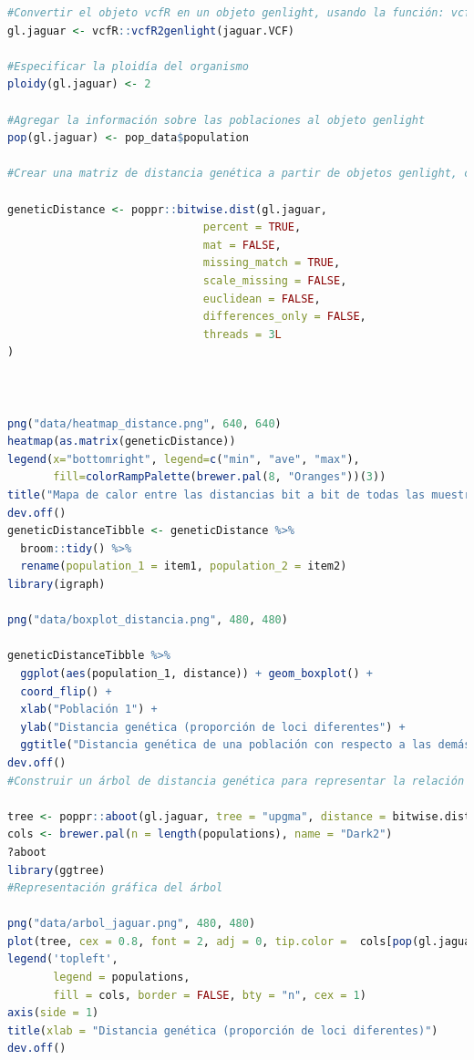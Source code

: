 \documentclass{article}
\begin{document}
\begin{lstlisting}[language=R]
#Convertir el objeto vcfR en un objeto genlight, usando la función: vcfR2genlight:
gl.jaguar <- vcfR::vcfR2genlight(jaguar.VCF)

#Especificar la ploidía del organismo
ploidy(gl.jaguar) <- 2

#Agregar la información sobre las poblaciones al objeto genlight
pop(gl.jaguar) <- pop_data$population

#Crear una matriz de distancia genética a partir de objetos genlight, con la función bitwise.dist().

geneticDistance <- poppr::bitwise.dist(gl.jaguar,
                              percent = TRUE,
                              mat = FALSE,
                              missing_match = TRUE,
                              scale_missing = FALSE,
                              euclidean = FALSE,
                              differences_only = FALSE,
                              threads = 3L
)



png("data/heatmap_distance.png", 640, 640)
heatmap(as.matrix(geneticDistance))
legend(x="bottomright", legend=c("min", "ave", "max"), 
       fill=colorRampPalette(brewer.pal(8, "Oranges"))(3))
title("Mapa de calor entre las distancias bit a bit de todas las muestras")
dev.off()
geneticDistanceTibble <- geneticDistance %>% 
  broom::tidy() %>% 
  rename(population_1 = item1, population_2 = item2)
library(igraph)

png("data/boxplot_distancia.png", 480, 480)

geneticDistanceTibble %>% 
  ggplot(aes(population_1, distance)) + geom_boxplot() + 
  coord_flip() + 
  xlab("Población 1") + 
  ylab("Distancia genética (proporción de loci diferentes") + 
  ggtitle("Distancia genética de una población con respecto a las demás")
dev.off()
#Construir un árbol de distancia genética para representar la relación genética de las muestras. 

tree <- poppr::aboot(gl.jaguar, tree = "upgma", distance = bitwise.dist, sample = 100, showtree = FALSE, cutoff = 50, quiet = T)
cols <- brewer.pal(n = length(populations), name = "Dark2")
?aboot
library(ggtree)
#Representación gráfica del árbol 

png("data/arbol_jaguar.png", 480, 480)
plot(tree, cex = 0.8, font = 2, adj = 0, tip.color =  cols[pop(gl.jaguar)], type = "phylogram")
legend('topleft',
       legend = populations,
       fill = cols, border = FALSE, bty = "n", cex = 1)
axis(side = 1)
title(xlab = "Distancia genética (proporción de loci diferentes)")
dev.off()


\end{lstlisting}
\end{document}
